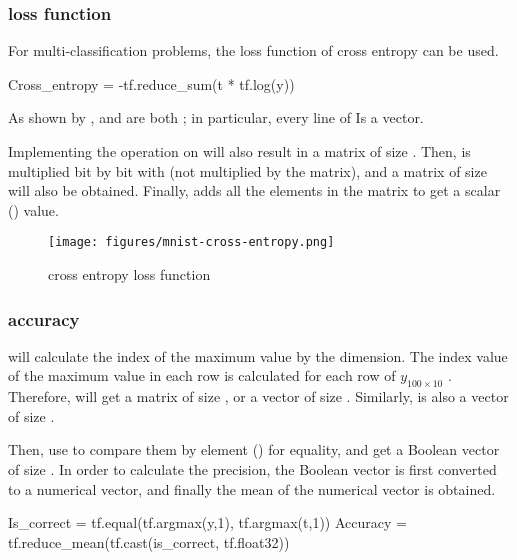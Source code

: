 \begin{content}
\begin{content}
\subsubsection{loss function}

For multi-classification problems, the loss function of cross entropy can be used.

\begin{leftbar}
\begin{python}
Cross_entropy = -tf.reduce_sum(t * tf.log(y))
\end{python}
\end{leftbar}

As shown by ,  and  are both \code{[100, 10]}; in particular, every line of  Is a  vector.

Implementing the  operation on  will also result in a matrix of size \code{[100, 10]}. Then,  is multiplied bit by bit with  (not multiplied by the matrix), and a matrix of size \code{[100, 10]} will also be obtained. Finally,  adds all the elements in the matrix to get a scalar () value.

\begin{figure}[H]
\centering
\texttt{[image: figures/mnist-cross-entropy.png]}
\caption{cross entropy loss function}
 \label{fig:mnist-cross-entropy}
\end{figure}

\subsubsection{accuracy}

 will calculate the index of the maximum value by the  dimension. The index value of the maximum value in each row is calculated for each row of $ y_{100 \times 10} $ . Therefore,  will get a matrix of size \code{[100, 1]}, or a vector of size . Similarly,  is also a vector of size .

Then, use  to compare them by element () for equality, and get a Boolean vector of size . In order to calculate the precision, the Boolean vector is first converted to a numerical vector, and finally the mean of the numerical vector is obtained.

\begin{leftbar}
\begin{python}
Is_correct = tf.equal(tf.argmax(y,1), tf.argmax(t,1))
Accuracy = tf.reduce_mean(tf.cast(is_correct, tf.float32))
\end{python}
\end{leftbar}


\end{content}
\end{content}
